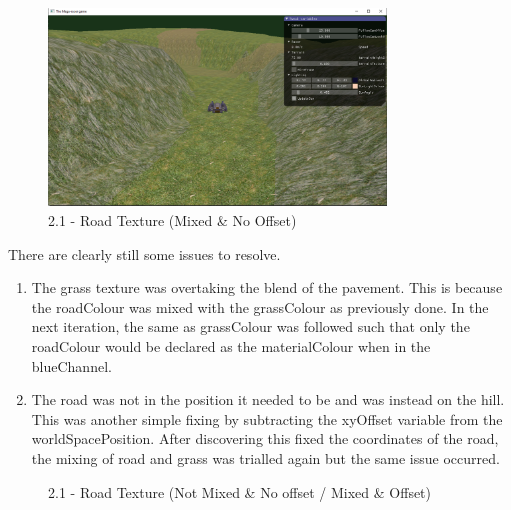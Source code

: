 \documentclass[a4 paper, 12pt]{article}
\begin{document}
\begin{figure} [H]
    \centering
    \includegraphics[width=0.8\textwidth, frame]
        {./images/mega_racer/2.1_c_1.PNG}
    \caption{2.1 - Road Texture (Mixed \& No Offset)}   
\end{figure}

There are clearly still some issues to resolve. 
\begin{enumerate}
    \item The grass texture was overtaking the blend of the pavement. This is because the roadColour was mixed with the grassColour as previously done. In the next iteration, the same as grassColour was followed such that only the roadColour would be declared as the materialColour when in the blueChannel.
    \item The road was not in the position it needed to be and was instead on the hill. This was another simple fixing by subtracting the xyOffset variable from the worldSpacePosition. After discovering this fixed the coordinates of the road, the mixing of road and grass was trialled again but the same issue occurred.
\end{enumerate}

\begin{figure} [H]
        \caption{2.1 - Road Texture (Not Mixed \& No offset / Mixed \& Offset)}   
\end{figure}
\end{document}
